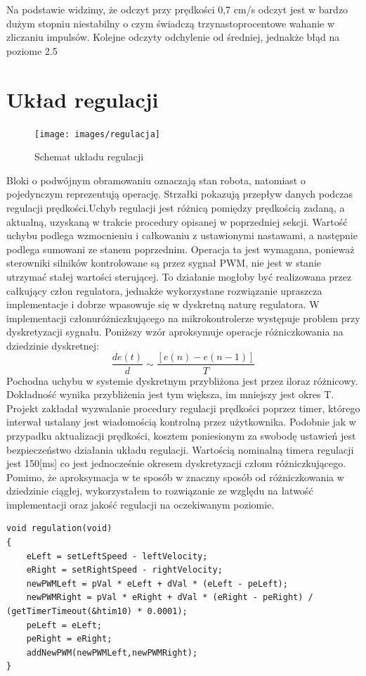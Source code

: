 \documentclass[eng,printmode]{mgr}
\begin{document}
Na podstawie widzimy, że odczyt przy prędkości 0,7 cm/s odczyt jest w bardzo dużym stopniu niestabilny o czym świadczą trzynastoprocentowe wahanie w zliczaniu impulsów. Kolejne odczyty odchylenie od średniej, jednakże błąd na poziome 2.5%

 \section{Układ regulacji}
   \begin{figure}[ht]
    \centering
    \texttt{[image: images/regulacja]}
    \caption{Schemat układu regulacji}
    \label{fig:regulacja}
   \end{figure}

Bloki o podwójnym obramowaniu oznaczają stan robota, natomiast o pojedynczym reprezentują operację. Strzałki pokazują przepływ danych podczas regulacji prędkości.Uchyb regulacji jest różnicą pomiędzy prędkością zadaną, a aktualną, uzyskaną w trakcie procedury opisanej w poprzedniej sekcji. Wartość uchybu podlega wzmocnieniu i całkowaniu z ustawionymi nastawami, a następnie podlega sumowani ze stanem poprzednim. Operacja ta jest wymagana,  ponieważ sterowniki silników kontrolowane są przez sygnał PWM, nie jest w stanie utrzymać stałej wartości sterującej. To działanie mogłoby być realizowana przez całkujący człon regulatora, jednakże wykorzystane rozwiązanie upraszcza implementacje i dobrze wpasowuje się w dyskretną naturę regulatora.
W implementacji członuróżniczkującego na mikrokontrolerze występuje problem przy dyskretyzacji sygnału. Poniższy wzór aproksymuje operacje różniczkowania na dziedzinie dyskretnej:
\begin{equation}\label{eq:aproksymacja}
   \frac{de(t)}{d} \sim \frac{[e(n) - e(n-1)]}{T} 
  \end{equation}
Pochodna uchybu w systemie dyskretnym przybliżona jest przez iloraz różnicowy. Dokładność wynika przybliżenia jest tym większa, im mniejszy jest okres T. Projekt zakładał wyzwalanie procedury regulacji prędkości poprzez timer, którego interwał ustalany jest wiadomością kontrolną przez użytkownika. Podobnie jak w przypadku aktualizacji prędkości, kosztem poniesionym za swobodę ustawień jest bezpieczeństwo działania układu regulacji. Wartością nominalną timera regulacji jest 150[ms] co jest jednocześnie okresem dyskretyzacji członu różniczkującego. Pomimo, że aproksymacja w te sposób w znaczny sposób od różniczkowania w dziedzinie ciągłej, wykorzystałem to rozwiązanie ze względu na łatwość implementacji oraz jakość regulacji na oczekiwanym poziomie.
\begin{lstlisting}[style=c]
void regulation(void)
{
	eLeft = setLeftSpeed - leftVelocity;
	eRight = setRightSpeed - rightVelocity;
	newPWMLeft = pVal * eLeft + dVal * (eLeft - peLeft);
	newPWMRight = pVal * eRight + dVal * (eRight - peRight) / (getTimerTimeout(&htim10) * 0.0001);         
	peLeft = eLeft;
	peRight = eRight;
	addNewPWM(newPWMLeft,newPWMRight);
}
\end{lstlisting}
\end{document}
